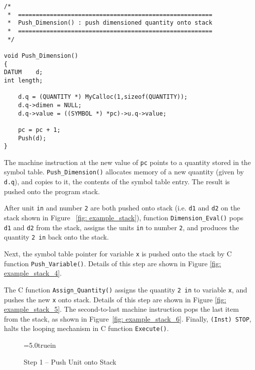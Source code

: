 \begin{footnotesize}
\begin{verbatim}
/* 
 *  ======================================================= 
 *  Push_Dimension() : push dimensioned quantity onto stack 
 *  ======================================================= 
 */ 

void Push_Dimension()
{
DATUM    d;
int length;

    d.q = (QUANTITY *) MyCalloc(1,sizeof(QUANTITY));
    d.q->dimen = NULL;
    d.q->value = ((SYMBOL *) *pc)->u.q->value;

    pc = pc + 1;
    Push(d);
}
\end{verbatim}
\end{footnotesize}

\vspace{0.15 in}\noindent
The machine instruction at the new value of {\tt pc} points to a
quantity stored in the symbol table. {\tt Push\_Dimension()} allocates
memory of a new quantity (given by {\tt d.q}),
and copies to it, the contents of the symbol table entry.
The result is pushed onto the program stack.

\vspace{0.15 in}
\noindent\hspace{0.50 in}
After unit {\tt in} and number {\tt 2} are both
pushed onto stack (i.e. {\tt d1} and {\tt d2}
on the stack shown in Figure ~\ref{fig: example_stack}),
function {\tt Dimension\_Eval()} pops {\tt d1} and {\tt d2} from the stack,
assigns the units {\tt in} to number {\tt 2},
and produces the quantity {\tt 2 in} back onto the stack.

\vspace{0.15 in}
\noindent\hspace{0.5 in}
Next, the symbol table pointer for variable {\tt x} is pushed
onto the stack by C function {\tt Push\_Variable()}.
Details of this step are shown in Figure \ref{fig: example_stack_4}.

\vspace{0.15 in}
\noindent\hspace{0.5 in}
The C function {\tt Assign\_Quantity()} assigns the quantity
{\tt 2 in} to variable {\tt x}, and pushes the new {\tt x} onto stack.
Details of this step are shown in Figure \ref{fig: example_stack_5}.
The second-to-last machine instruction pops the last item from the stack,
as shown in Figure~\ref{fig: example_stack_6}.
Finally, {\tt (Inst) STOP}, halts the looping mechanism in C function {\tt Execute()}.

\clearpage
\begin{figure}[h]
\epsfxsize=5.0truein
\centerline{}
\caption{Step 1 -- Push Unit onto Stack}
\label{fig: example_stack_1}
\end{figure}

